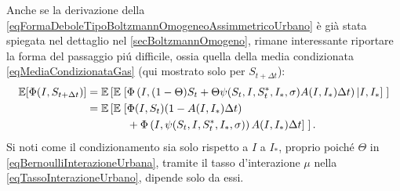                 \begin{oss}
                    Anche se la derivazione della \ref{eqFormaDeboleTipoBoltzmannOmogeneoAssimmetricoUrbano} è già stata spiegata nel dettaglio nel \cref{secBoltzmannOmogeno}, rimane interessante riportare la forma del passaggio piú difficile, ossia quella della media condizionata \cref{eqMediaCondizionataGas} (qui mostrato solo per \(S_{t+\Delta t}\)):
                    \begin{equation*}
                        \begin{aligned}
                            \mathbb E[\Phi(I,S_{t+\Delta t})]=
                            \mathbb E\left[\mathbb E\right.[
                                &\Phi\left(I,(1-\Theta)S_t
                                +\Theta\psi(S_t,I,S_t^*,I_*,\sigma)
                                A(I,I_*)\Delta t\right)|I,I_*
                            ]\left.\vphantom{\mathbb E}\right]\\
                            =\mathbb E\left[
                                \mathbb E\right.[
                                &\Phi(I,S_t)(1-A(I,I_*)\Delta t)
                                \\&+\Phi\left(
                                    I,\psi(S_t,I,S_t^*,I_*,\sigma)
                                \right)A(I,I_*)\Delta t
                            ]\left.\vphantom{\mathbb E}\right].
                        \end{aligned}
                    \end{equation*}
                    Si noti come il condizionamento sia solo rispetto a \(I\) a \(I_*\), proprio poiché \(\Theta\) in \ref{eqBernoulliInterazioneUrbana}, tramite il tasso d'interazione \(\mu\) nella \cref{eqTassoInterazioneUrbano}, dipende solo da essi.
                \end{oss}
            

